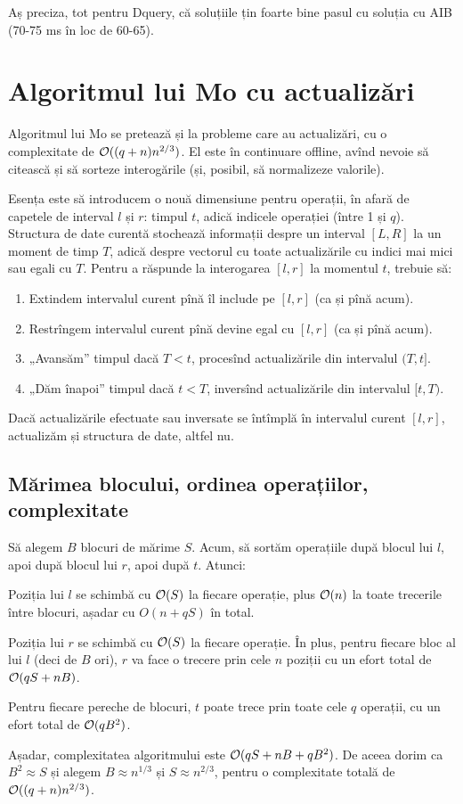 \documentclass[../main.tex]{subfiles}
\begin{document}
Aș preciza, tot pentru Dquery, că soluțiile țin foarte bine pasul cu soluția cu AIB (70-75 ms în loc de 60-65).

\section{Algoritmul lui Mo cu actualizări}

Algoritmul lui Mo se pretează și la probleme care au actualizări, cu o complexitate de $\mathcal{O}((q + n) n^{2/3})$. El este în continuare offline, avînd nevoie să citească și să sorteze interogările (și, posibil, să normalizeze valorile).

Esența este să introducem o nouă dimensiune pentru operații, în afară de capetele de interval $l$ și $r$: timpul $t$, adică indicele operației (între 1 și $q$). Structura de date curentă stochează informații despre un interval $[L,R]$ la un moment de timp $T$, adică despre vectorul cu toate actualizările cu indici mai mici sau egali cu $T$. Pentru a răspunde la interogarea $[l,r]$ la momentul $t$, trebuie să:

\begin{enumerate}
  \item Extindem intervalul curent pînă îl include pe $[l,r]$ (ca și pînă acum).
  \item Restrîngem intervalul curent pînă devine egal cu $[l,r]$ (ca și pînă acum).
  \item „Avansăm” timpul dacă $T < t$, procesînd actualizările din intervalul $(T, t]$.
  \item „Dăm înapoi” timpul dacă $t < T$, inversînd actualizările din intervalul $[t, T)$.
\end{enumerate}

Dacă actualizările efectuate sau inversate se întîmplă în intervalul curent $[l,r]$, actualizăm și structura de date, altfel nu.

\subsection{Mărimea blocului, ordinea operațiilor, complexitate}

Să alegem $B$ blocuri de mărime $S$. Acum, să sortăm operațiile după blocul lui $l$, apoi după blocul lui $r$, apoi după $t$. Atunci:

Poziția lui $l$ se schimbă cu $\mathcal{O}(S)$ la fiecare operație, plus $\mathcal{O}(n)$ la toate trecerile între blocuri, așadar cu $O(n + qS)$ în total.

Poziția lui $r$ se schimbă cu $\mathcal{O}(S)$ la fiecare operație. În plus, pentru fiecare bloc al lui $l$ (deci de $B$ ori), $r$ va face o trecere prin cele $n$ poziții cu un efort total de $\mathcal{O}(qS + nB)$.

Pentru fiecare pereche de blocuri, $t$ poate trece prin toate cele $q$ operații, cu un efort total de $\mathcal{O}(qB^2)$.

Așadar, complexitatea algoritmului este $\mathcal{O}(qS + nB + qB^2)$. De aceea dorim ca $B^2 \approx S$ și alegem $B \approx n^{1/3}$ și $S \approx n^{2/3}$, pentru o complexitate totală de $\mathcal{O}((q + n)n^{2/3})$.
\end{document}
